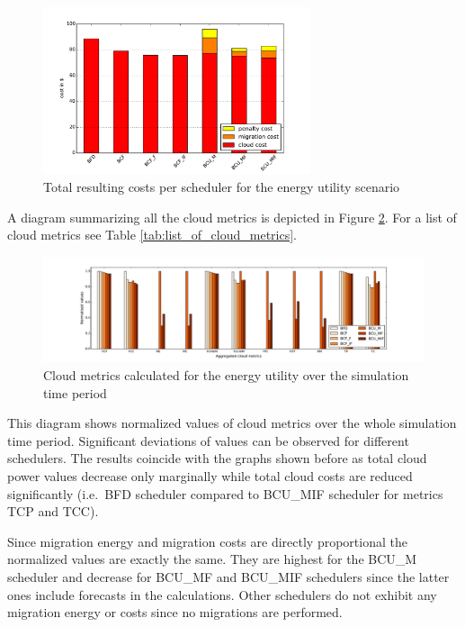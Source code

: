 \begin{figure}[htbp]
	\centering
		\includegraphics[width=0.7\textwidth]{figures/evaluation_and_results/energy_utility_total_cost.pdf}
	\caption{Total resulting costs per scheduler for the energy utility scenario}
	\label{fig:energy_utility_total_cost}
\end{figure}

A diagram summarizing all the cloud metrics is depicted in Figure \ref{fig:energy_utility_cloud_metrics}. For a list of cloud metrics see Table \ref{tab:list_of_cloud_metrics}. 

\begin{figure}[bp]
	\centering
	\hspace*{-1.6in}
		\includegraphics[width=1.50\textwidth]{figures/evaluation_and_results/energy_utility_cloud_metrics.pdf}
	\caption{Cloud metrics calculated for the energy utility over the simulation time period}
	\label{fig:energy_utility_cloud_metrics}
\end{figure}

This diagram shows normalized values of cloud metrics over the whole simulation time period. Significant deviations of values can be observed for different schedulers. The results coincide with the graphs shown before as total cloud power values decrease only marginally while total cloud costs are reduced significantly (i.e.~BFD scheduler compared to BCU\_MIF scheduler for metrics TCP and TCC). 

Since migration energy and migration costs are directly proportional the normalized values are exactly the same. They are highest for the BCU\_M scheduler and decrease for BCU\_MF and BCU\_MIF schedulers since the latter ones include forecasts in the calculations. Other schedulers do not exhibit any migration energy or costs since no migrations are performed. 

